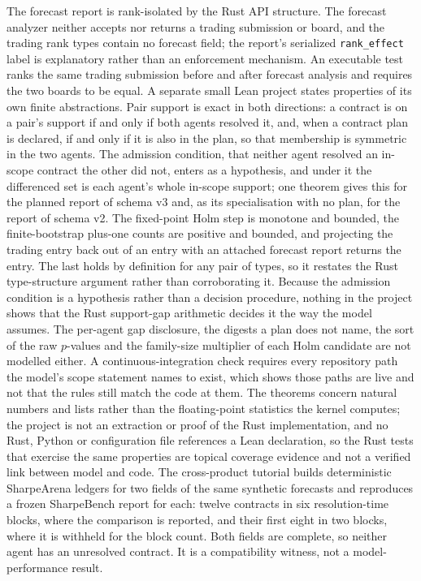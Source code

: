 The forecast report is rank-isolated by the Rust API structure. The forecast analyzer neither accepts nor returns a trading submission or board, and the trading rank types contain no forecast field; the report's serialized \texttt{rank\_effect} label is explanatory rather than an enforcement mechanism. An executable test ranks the same trading submission before and after forecast analysis and requires the two boards to be equal. A separate small Lean project states properties of its own finite abstractions. Pair support is exact in both directions: a contract is on a pair's support if and only if both agents resolved it, and, when a contract plan is declared, if and only if it is also in the plan, so that membership is symmetric in the two agents. The admission condition, that neither agent resolved an in-scope contract the other did not, enters as a hypothesis, and under it the differenced set is each agent's whole in-scope support; one theorem gives this for the planned report of schema v3 and, as its specialisation with no plan, for the report of schema v2. The fixed-point Holm step is monotone and bounded, the finite-bootstrap plus-one counts are positive and bounded, and projecting the trading entry back out of an entry with an attached forecast report returns the entry. The last holds by definition for any pair of types, so it restates the Rust type-structure argument rather than corroborating it. Because the admission condition is a hypothesis rather than a decision procedure, nothing in the project shows that the Rust support-gap arithmetic decides it the way the model assumes. The per-agent gap disclosure, the digests a plan does not name, the sort of the raw $p$-values and the family-size multiplier of each Holm candidate are not modelled either. A continuous-integration check requires every repository path the model's scope statement names to exist, which shows those paths are live and not that the rules still match the code at them. The theorems concern natural numbers and lists rather than the floating-point statistics the kernel computes; the project is not an extraction or proof of the Rust implementation, and no Rust, Python or configuration file references a Lean declaration, so the Rust tests that exercise the same properties are topical coverage evidence and not a verified link between model and code. The cross-product tutorial builds deterministic SharpeArena ledgers for two fields of the same synthetic forecasts and reproduces a frozen SharpeBench report for each: twelve contracts in six resolution-time blocks, where the comparison is reported, and their first eight in two blocks, where it is withheld for the block count. Both fields are complete, so neither agent has an unresolved contract. It is a compatibility witness, not a model-performance result.

